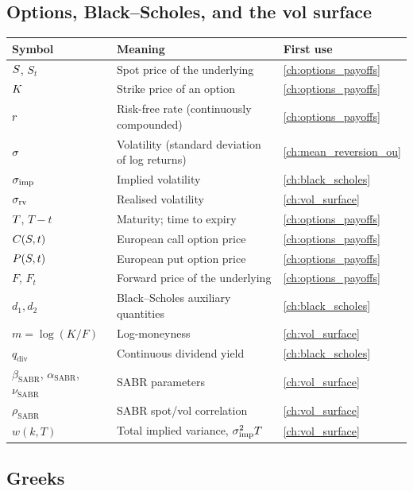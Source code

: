 \subsection{Options, Black--Scholes, and the vol surface}

\begin{longtable}{@{}l >{\raggedright\arraybackslash}p{} l@{}}
\toprule
\textbf{Symbol} & \textbf{Meaning} & \textbf{First use} \\
\midrule
\endhead
$S$, $S_t$ & Spot price of the underlying & \cref{ch:options_payoffs} \\
$K$ & Strike price of an option & \cref{ch:options_payoffs} \\
$r$ & Risk-free rate (continuously compounded) & \cref{ch:options_payoffs} \\
$\sigma$ & Volatility (standard deviation of log returns) & \cref{ch:mean_reversion_ou} \\
$\sigma_{\text{imp}}$ & Implied volatility & \cref{ch:black_scholes} \\
$\sigma_{\text{rv}}$ & Realised volatility & \cref{ch:vol_surface} \\
$T$, $T-t$ & Maturity; time to expiry & \cref{ch:options_payoffs} \\
$C(S,t)$ & European call option price & \cref{ch:options_payoffs} \\
$P(S,t)$ & European put option price & \cref{ch:options_payoffs} \\
$F$, $F_t$ & Forward price of the underlying & \cref{ch:options_payoffs} \\
$d_1, d_2$ & Black--Scholes auxiliary quantities & \cref{ch:black_scholes} \\
$m = \log(K/F)$ & Log-moneyness & \cref{ch:vol_surface} \\
$q_{\text{div}}$ & Continuous dividend yield & \cref{ch:black_scholes} \\
$\beta_{\text{SABR}}$, $\alpha_{\text{SABR}}$, $\nu_{\text{SABR}}$ & SABR parameters & \cref{ch:vol_surface} \\
$\rho_{\text{SABR}}$ & SABR spot/vol correlation & \cref{ch:vol_surface} \\
$w(k,T)$ & Total implied variance, $\sigma_{\text{imp}}^2 T$ & \cref{ch:vol_surface} \\
\bottomrule
\end{longtable}

\subsection{Greeks}

